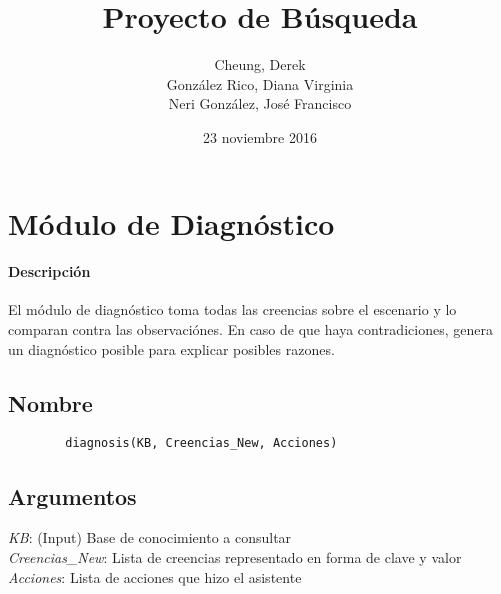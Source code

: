 \documentclass[11pt,fleqn]{article}
\begin{document}
\title{Proyecto de Búsqueda}
\author{
	Cheung, Derek \\
	González Rico, Diana Virginia \\
	Neri González, José Francisco
}
\date{23 noviembre 2016}
\maketitle

\section{Módulo de Diagnóstico}

\paragraph{Descripción} El módulo de diagnóstico toma todas las creencias sobre el escenario y lo comparan contra las observaciónes. En caso de que haya contradiciones, genera un diagnóstico posible para explicar posibles razones.

\subsection*{Nombre}
	\begin{verbatim}
		diagnosis(KB, Creencias_New, Acciones)
	\end{verbatim}

\subsection*{Argumentos}
	\textit{KB}: (Input) Base de conocimiento a consultar \\
	\textit{Creencias\_New}: Lista de creencias representado en forma de clave y valor \\
	\textit{Acciones}: Lista de acciones que hizo el asistente
\end{document}
